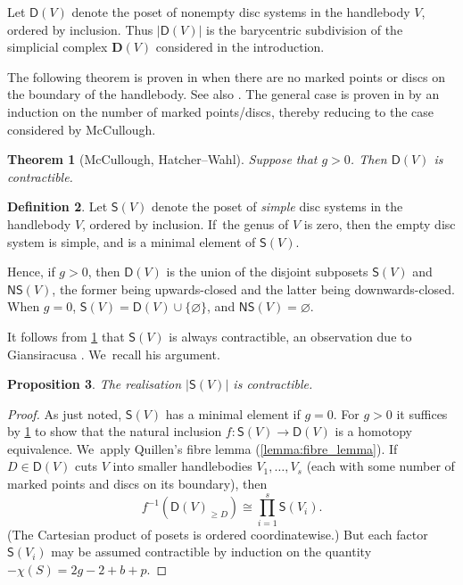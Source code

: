 \documentclass[JEP,XML,SOM,Unicode,NoFloatCountersInSection,published]{cedram}
\theoremstyle{plain}
\newtheorem{thm}{Theorem}[section]
\newtheorem{prop}[thm]{Proposition}
\theoremstyle{definition}
\newtheorem{defn}[thm]{Definition}
\newcommand{\NS}{\mathsf{NS}}
\newcommand{\D}{\mathsf{D}}
\newcommand{\SD}{\mathsf{S}}
\begin{document}
Let $\D(V)$ denote the poset of nonempty disc systems in the handlebody $V$, ordered by inclusion. Thus $|\D(V)|$ is the barycentric subdivision of the simplicial complex $ \mathbf D(V)$ considered in the introduction.

The following theorem is proven in \cite[Th.\,5.3]{mccullough} when there are no marked points or discs on the boundary of the handlebody. See also \cite{cho}. The general case is proven in \cite[Prop.\,8.1]{hatcherwahl} by an induction on the number of marked points/discs, thereby reducing to the case considered by McCullough.

\begin{thm}[McCullough, Hatcher--Wahl]\label{disk cx contractible}
Suppose that $g>0$. Then $\D(V)$ is contractible.
\end{thm}

\begin{defn}Let
$\SD(V)$ denote the poset of \emph{simple} disc systems in the handlebody $V$, ordered by inclusion. If~the genus of $V$ is zero, then the empty disc system is simple, and is a minimal element of $\SD(V)$.
\end{defn}

Hence, if $g>0$, then $\mathsf D(V)$ is the union of the disjoint subposets $\SD(V)$ and $\NS(V)$, the former being upwards-closed and the latter being downwards-closed. When $g=0$, $\mathsf S(V)=\mathsf D(V) \cup \{\varnothing\}$, and $\NS(V)=\varnothing$.

It follows from \cref{disk cx contractible} that $\SD(V)$ is always contractible, an observation due to Giansiracusa \cite[Prop.\,6.3]{giansiracusa}. We~recall his argument.

\begin{prop}\label{prop: S contractible}
The realisation $|\SD(V)|$ is contractible.
\end{prop}

\begin{proof}
As just noted, $\SD(V)$ has a minimal element if $g=0$. For $g>0$ it suffices by \cref{disk cx contractible} to show that the natural inclusion $f:\SD(V)\to\D(V)$ is a homotopy equivalence. We~apply Quillen's fibre lemma (\ref{lemma:fibre_lemma}). If~$D \in \D(V)$ cuts $V$ into smaller handlebodies $V_1,\dots,V_s$ (each with some number of marked points and discs on its boundary), then
\[
f^{-1}(\D(V)_{\geq D}) \cong \prod_{i=1}^s \SD(V_i).
\](The Cartesian product of posets is ordered coordinatewise.)
But each factor $\SD(V_i)$ may be assumed contractible by induction on the quantity $-\chi(S) = 2g-2+b+p$.
\end{proof}
\end{document}
